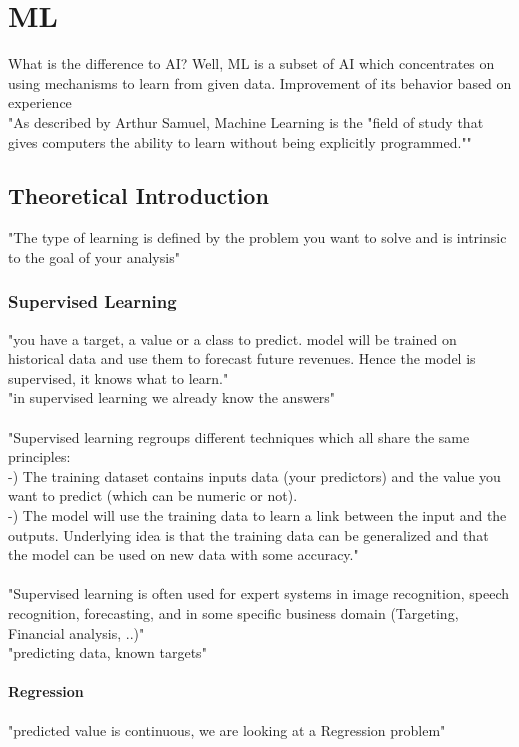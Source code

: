 \documentclass[MGS,Master,english]{twbook}%
\begin{document}
\chapter{\acl{ML}}
What is the difference to AI? Well, ML is a subset of AI which concentrates on using mechanisms to learn from given data. Improvement of its behavior based on experience\\
"As described by Arthur Samuel, Machine Learning is the "field of study that gives computers the ability to learn without being explicitly programmed."" \cite{ml:3}
\section{Theoretical Introduction}
"The type of learning is defined by the problem you want to solve and is intrinsic to the goal of your analysis" \cite{ml:1}

\subsection{Supervised Learning}
"you have a target, a value or a class to predict. model will be trained on historical data and use them to forecast future revenues. Hence the model is supervised, it knows what to learn." \cite{ml:1}\\
"in supervised learning we already know the answers" \cite{ml:2}\\
\\
"Supervised learning regroups different techniques which all share the same principles:\\
-) The training dataset contains inputs data (your predictors) and the value you want to predict (which can be numeric or not).\\
-) The model will use the training data to learn a link between the input and the outputs. Underlying idea is that the training data can be generalized and that the model can be used on new data with some accuracy." \cite{ml:1}\\
\\
"Supervised learning is often used for expert systems in image recognition, speech recognition, forecasting, and in some specific business domain (Targeting, Financial analysis, ..)"\cite{ml:1}\\
"predicting data, known targets" \cite{ml:2}

\subsubsection{Regression}
"predicted value is continuous, we are looking at a Regression problem" \cite{ml:1}
\end{document}
